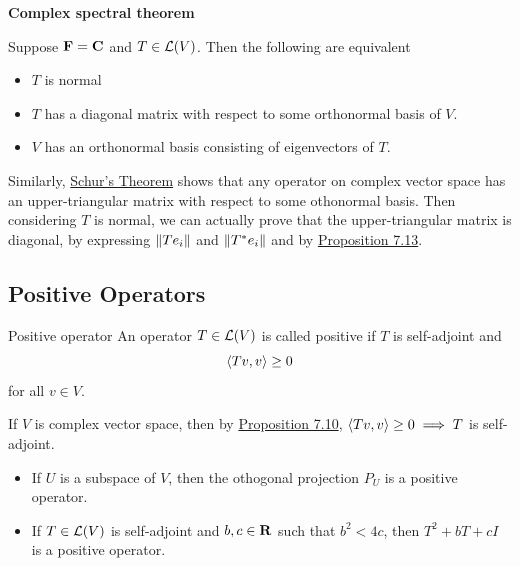 \documentclass[12pt,a4paper]{article}
\begin{document}
    \begin{thm}
        \textbf{Complex spectral theorem}
        
        Suppose $\mathbf{F}=\mathbf{C}$ and $T\in\mathcal{L}(V)$. Then the following are equivalent
        \begin{itemize}
            \item $T$ is normal
            \item $T$ has a diagonal matrix with respect to some orthonormal basis of $V$.
            \item $V$ has an orthonormal basis consisting of eigenvectors of $T$.
        \end{itemize}
    \end{thm}
    \begin{remark}
        Similarly, \hyperref[6.24]{Schur’s Theorem} shows that any operator on complex vector space has an upper-triangular matrix with respect to some othonormal basis. Then considering $T$ is normal, we can actually prove that the upper-triangular matrix is diagonal, by expressing $\left\lVert Te_i\right\rVert$ and $\left\lVert T^*e_i\right\rVert$ and by \hyperref[7.13]{Proposition 7.13}.
    \end{remark}
    \hfill

    \subsection{Positive Operators}
    \begin{defi}{Positive operator}
        An operator $T\in\mathcal{L}(V)$ is called positive if $T$ is self-adjoint and
        $$
        \langle Tv,v\rangle\geq0
        $$
        for all $v\in V$.
    \end{defi}
    \begin{remark}
        If $V$ is complex vector space, then by \hyperref[7.10]{Proposition 7.10}, $\langle Tv,v\rangle\geq0\implies T$ is self-adjoint.
    \end{remark}
    \hfill

    \begin{eg}
        \hfill
        
        \begin{itemize}
            \item If $U$ is a subspace of $V$, then the othogonal projection $P_U$ is a positive operator.
            \item If $T\in\mathcal{L}(V)$ is self-adjoint and $b,c\in\mathbf{R}$ such that $b^2<4c$, then $T^2+bT+cI$ is a positive operator.
        \end{itemize}
    \end{eg}
    \hfill
\end{document}
